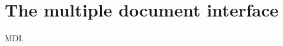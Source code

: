 \chapter{The multiple document interface}\label{chapmdi}
%
%
\setfooter{\thepage}{}{}{}{}{\thepage}%

MDI.

